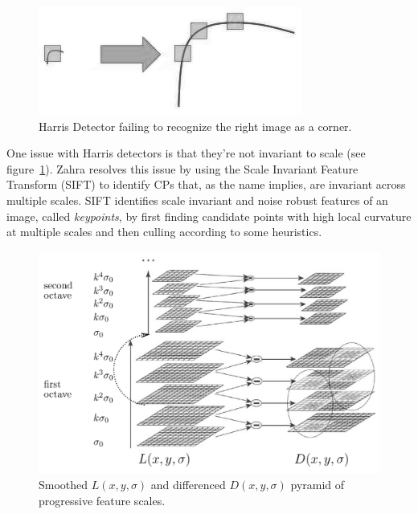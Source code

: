 \begin{figure}
    \centering
    \includegraphics[width=\linewidth,keepaspectratio]{figures/sift/sift_scale_invariant.png}
    \caption{Harris Detector failing to recognize the right image as a corner.}
    \label{fig:sift_harris}
\end{figure}
One issue with Harris detectors is that they're not invariant to scale (see figure~\ref{fig:sift_harris}).
%
Zahra \etal\cite{zahrasift} resolves this issue by using the Scale Invariant Feature Transform\cite{lowe2004distinctive} (SIFT) to identify CPs that, as the name implies, are invariant across multiple scales.
%
SIFT identifies scale invariant and noise robust features of an image, called \textit{keypoints}, by first finding candidate points with high local curvature at multiple scales and then culling according to some heuristics.
\begin{figure}
    \centering
    \includegraphics[width=\linewidth,keepaspectratio]{figures/sift/pyramid.png}
    \caption{Smoothed $L(x,y, \sigma)$ and differenced $D(x,y,\sigma)$ pyramid of progressive feature scales\cite{lowe2004distinctive}.}
    \label{fig:sift_pyramid}
\end{figure}
